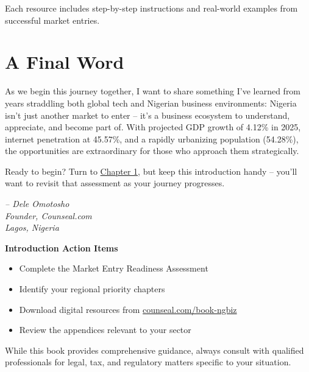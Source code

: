 Each resource includes step-by-step instructions and real-world examples from successful market entries.

\section{A Final Word}\label{sec:final-word}

As we begin this journey together, I want to share something I've learned from years straddling both global tech and Nigerian business environments: Nigeria isn't just another market to enter – it's a business ecosystem to understand, appreciate, and become part of. With projected GDP growth of 4.12\% in 2025, internet penetration at 45.57\%, and a rapidly urbanizing population (54.28\%), the opportunities are extraordinary for those who approach them strategically.

Ready to begin? Turn to \hyperref[ch:understanding-the-nigerian-business-landscape]{Chapter 1}, but keep this introduction handy – you'll want to revisit that assessment as your journey progresses.

\begin{flushright}
\textit{-- Dele Omotosho\\
Founder, Counseal.com\\
Lagos, Nigeria}
\end{flushright}

\begin{workshopbox}
\textbf{Introduction Action Items}
\begin{itemize}
    \item Complete the Market Entry Readiness Assessment
    \item Identify your regional priority chapters
    \item Download digital resources from \href{https://viz.li/csl-book-ngbiz}{counseal.com/book-ngbiz}
    \item Review the appendices relevant to your sector
\end{itemize}
\end{workshopbox}

\begin{warningbox}
While this book provides comprehensive guidance, always consult with qualified professionals for legal, tax, and regulatory matters specific to your situation.
\end{warningbox}